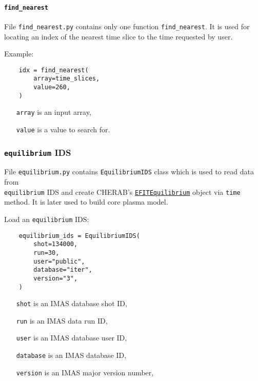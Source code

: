 \documentclass[../main.tex]{subfiles}
\begin{document}
\paragraph{\texttt{find\_nearest}}%
\label{par:find_nearest}

File \texttt{find\_nearest.py} contains only one function \texttt{find\_nearest}. It is used for locating an index of the nearest time slice to the time requested by user.

Example:
\begin{verbatim}
    idx = find_nearest(
        array=time_slices,
        value=260,
    )
\end{verbatim}

\begin{itemize}[align=left]
    \item[\texttt{array}] is an input array,
    \item[\texttt{value}] is a value to search for.
\end{itemize}

\subsubsection{\texttt{equilibrium} IDS}%
\label{sec:equilibrium_ids}

File \texttt{equilibrium.py} contains \texttt{EquilibriumIDS} class which is used to read data from \\ \texttt{equilibrium} IDS and create CHERAB's \href{https://cherab.github.io/documentation/plasmas/equilibrium.html?highlight=efit#cherab.tools.equilibrium.efit.EFITEquilibrium}{\texttt{EFITEquilibrium}} object via \texttt{time} method. It is later used to build core plasma model.

Load an \texttt{equilibrium} IDS:
\begin{verbatim}
    equilibrium_ids = EquilibriumIDS(
        shot=134000,
        run=30,
        user="public",
        database="iter",
        version="3",
    )
\end{verbatim}

\begin{itemize}[align=left]
    \item[\texttt{shot}] is an IMAS database shot ID,
    \item[\texttt{run}] is an IMAS data run ID,
    \item[\texttt{user}] is an IMAS database user ID,
    \item[\texttt{database}] is an IMAS database ID,
    \item[\texttt{version}] is an IMAS major version number,
\end{itemize}
\end{document}
